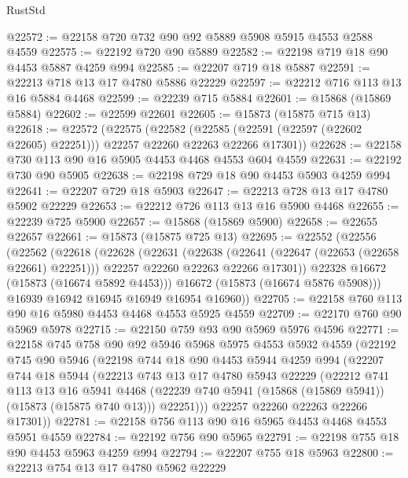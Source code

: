 \begin{lexlean}{RustStd}
\begin{coremodule}
@22572 := @22158 @720 @732 @90 @92 @5889 @5908 @5915 @4553 @2588 @4559
@22575 := @22192 @720 @90 @5889
@22582 := @22198 @719 @18 @90 @4453 @5887 @4259 @994
@22585 := @22207 @719 @18 @5887
@22591 := @22213 @718 @13 @17 @4780 @5886 @22229
@22597 := @22212 @716 @113 @13 @16 @5884 @4468
@22599 := @22239 @715 @5884
@22601 := @15868 (@15869 @5884)
@22602 := @22599 @22601
@22605 := @15873 (@15875 @715 @13)
@22618 := @22572
    (@22575
      (@22582 (@22585 (@22591 (@22597 (@22602 @22605) @22251))) @22257 @22260 @22263 @22266 @17301))
@22628 := @22158 @730 @113 @90 @16 @5905 @4453 @4468 @4553 @604 @4559
@22631 := @22192 @730 @90 @5905
@22638 := @22198 @729 @18 @90 @4453 @5903 @4259 @994
@22641 := @22207 @729 @18 @5903
@22647 := @22213 @728 @13 @17 @4780 @5902 @22229
@22653 := @22212 @726 @113 @13 @16 @5900 @4468
@22655 := @22239 @725 @5900
@22657 := @15868 (@15869 @5900)
@22658 := @22655 @22657
@22661 := @15873 (@15875 @725 @13)
@22695 := @22552
    (@22556
      (@22562
        (@22618
          (@22628
            (@22631
              (@22638
                (@22641 (@22647 (@22653 (@22658 @22661) @22251)))
                @22257
                @22260
                @22263
                @22266
                @17301))
            @22328
            @16672
            (@15873 (@16674 @5892 @4453)))
          @16672
          (@15873 (@16674 @5876 @5908)))
        @16939
        @16942
        @16945
        @16949
        @16954
        @16960))
@22705 := @22158 @760 @113 @90 @16 @5980 @4453 @4468 @4553 @5925 @4559
@22709 := @22170 @760 @90 @5969 @5978
@22715 := @22150 @759 @93 @90 @5969 @5976 @4596
@22771 := @22158
    @745
    @758
    @90
    @92
    @5946
    @5968
    @5975
    @4553
    @5932
    @4559
    (@22192
      @745
      @90
      @5946
      (@22198
        @744
        @18
        @90
        @4453
        @5944
        @4259
        @994
        (@22207
          @744
          @18
          @5944
          (@22213
            @743
            @13
            @17
            @4780
            @5943
            @22229
            (@22212
              @741
              @113
              @13
              @16
              @5941
              @4468
              (@22239 @740 @5941 (@15868 (@15869 @5941)) (@15873 (@15875 @740 @13)))
              @22251)))
        @22257
        @22260
        @22263
        @22266
        @17301))
@22781 := @22158 @756 @113 @90 @16 @5965 @4453 @4468 @4553 @5951 @4559
@22784 := @22192 @756 @90 @5965
@22791 := @22198 @755 @18 @90 @4453 @5963 @4259 @994
@22794 := @22207 @755 @18 @5963
@22800 := @22213 @754 @13 @17 @4780 @5962 @22229

\end{coremodule}
\end{lexlean}
